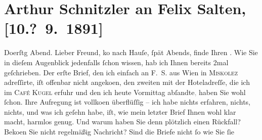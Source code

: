 

         
         \renewcommand{\erwaehntePersonen}{Personen: Marie Glümer, Bertha Karlsburg, Felix Salten}
         \renewcommand{\erwaehnteOrte}{Orte: Café Kugel, Miskolc, Wien}
         \renewcommand{\erwaehnteWerke}{Werke: ?? [Drama über Offizier, der Partnerin eines Untergebenen verführt]}
               \section[Arthur Schnitzler an Felix Salten, {[}10.? 9. 1891{]}]{ Arthur Schnitzler an Felix Salten, {[}10.? 9. 1891{]}}\nopagebreak{}\rehead{ }\begin{ledgroupsized}[t]{13cm}\normalsize\beginnumbering{} \toendnotes[C]{\smallbreak\pagebreak[2]} 
\toendnotes[C]{\smallbreak}\pstart
           \raggedleft{}{\pb}Do{\geminationn}erſtg{ }Abend. \pend
           \pstart
           Lieber Freund, ko{\geminationm} nach
               Hauſe, ſpät Abends, finde Ihren \label{K_L02951-1v}\label{K_L02951-1h}. Wie Sie in dieſem Augenblick jedenfalls ſchon wissen, hab ich Ihnen bereits
               2mal geſchrieben. Der erſte {\pb}Brief, den ich
               einfach an \textsc{F. S.} aus Wien in \textsc{Miskolez} adreſſirte, iſt offenbar nicht angeko{\geminationm}en, den
               zweiten mit der Hoteladreſſe, die ich im \textsc{Café Kugel} erfuhr und den ich heute{ }Vormittag abſandte\textcolor{gray}{,} haben Sie wohl ſchon. Ihre
               Aufregung ist vollko{\geminationm}en {\pb}überflüſſig – ich habe nichts erfahren,
               nichts, nichts, und was ich geſehn habe, iſt, wie mein letzter Brief Ihnen wohl klar
               macht, harmlos genug. Und warum haben Sie denn plötzlich einen Rückfall? Beko{\geminationm}en­ Sie nicht regelmäßig Nachricht? {\pb}Sind die Briefe nicht ſo wie Sie ſie

\end{ledgroupsized}
